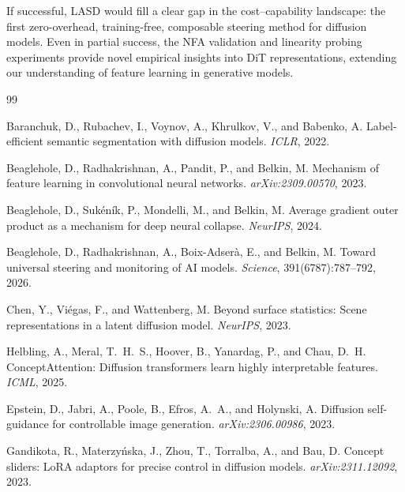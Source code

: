 \documentclass[11pt]{article}
\begin{document}
If successful, LASD would fill a clear gap in the cost--capability landscape: the first zero-overhead, training-free, composable steering method for diffusion models.
Even in partial success, the NFA validation and linearity probing experiments provide novel empirical insights into DiT representations, extending our understanding of feature learning in generative models.


\begin{thebibliography}{99}

Baranchuk, D., Rubachev, I., Voynov, A., Khrulkov, V., and Babenko, A.
\newblock Label-efficient semantic segmentation with diffusion models.
\newblock \emph{ICLR}, 2022.

Beaglehole, D., Radhakrishnan, A., Pandit, P., and Belkin, M.
\newblock Mechanism of feature learning in convolutional neural networks.
\newblock \emph{arXiv:2309.00570}, 2023.

Beaglehole, D., Suk\'{e}n\'{i}k, P., Mondelli, M., and Belkin, M.
\newblock Average gradient outer product as a mechanism for deep neural collapse.
\newblock \emph{NeurIPS}, 2024.

Beaglehole, D., Radhakrishnan, A., Boix-Adser\`{a}, E., and Belkin, M.
\newblock Toward universal steering and monitoring of {AI} models.
\newblock \emph{Science}, 391(6787):787--792, 2026.

Chen, Y., Vi\'{e}gas, F., and Wattenberg, M.
\newblock Beyond surface statistics: Scene representations in a latent diffusion model.
\newblock \emph{NeurIPS}, 2023.

Helbling, A., Meral, T.~H.~S., Hoover, B., Yanardag, P., and Chau, D.~H.
\newblock Concept{A}ttention: Diffusion transformers learn highly interpretable features.
\newblock \emph{ICML}, 2025.

Epstein, D., Jabri, A., Poole, B., Efros, A.~A., and Holynski, A.
\newblock Diffusion self-guidance for controllable image generation.
\newblock \emph{arXiv:2306.00986}, 2023.

Gandikota, R., Materzy\'{n}ska, J., Zhou, T., Torralba, A., and Bau, D.
\newblock Concept sliders: {LoRA} adaptors for precise control in diffusion models.
\newblock \emph{arXiv:2311.12092}, 2023.


\end{thebibliography}
\end{document}

